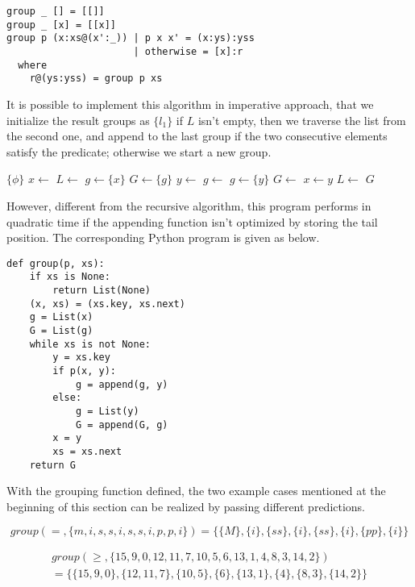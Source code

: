 \documentclass[b5paper]{article}
\begin{document}
\lstset{language=Haskell}
\begin{lstlisting}
group _ [] = [[]]
group _ [x] = [[x]]
group p (x:xs@(x':_)) | p x x' = (x:ys):yss
                      | otherwise = [x]:r
  where
    r@(ys:yss) = group p xs
\end{lstlisting}

It is possible to implement this algorithm in imperative approach, that we initialize the result groups as
$\{{l_1\}}$ if $L$ isn't empty, then we traverse the list from the second one, and append to the last group
if the two consecutive elements satisfy the predicate; otherwise we start a new group.

\begin{algorithmic}[1]
    \State \Return $\{ \phi \}$
  \EndIf
  \State $x \gets$ 
  \State $L \gets$ 
  \State $g \gets \{ x \}$
  \State $G \gets \{ g \}$
    \State $y \gets$ 
      \State $g \gets $ 
    \Else
      \State $g \gets \{y\}$
      \State $G \gets$ 
    \EndIf
    \State $x \gets y$
    \State $L \gets$ 
  \EndWhile
  \State \Return $G$
\EndFunction
\end{algorithmic}

However, different from the recursive algorithm, this program performs in quadratic time if the appending
function isn't optimized by storing the tail position.
The corresponding Python program is given as below.

\lstset{language=Python}
\begin{lstlisting}
def group(p, xs):
    if xs is None:
        return List(None)
    (x, xs) = (xs.key, xs.next)
    g = List(x)
    G = List(g)
    while xs is not None:
        y = xs.key
        if p(x, y):
            g = append(g, y)
        else:
            g = List(y)
            G = append(G, g)
        x = y
        xs = xs.next
    return G
\end{lstlisting}

With the grouping function defined, the two example cases mentioned at the beginning of this section can be
realized by passing different predictions.

\[
group(=, \{m,i,s,s,i,s,s,i,p,p,i\}) = \{ \{M\}, \{i\}, \{ss\}, \{i\}, \{ss\}, \{i\}, \{pp\}, \{i\} \}
\]

\[
\begin{array}{l}
group(\geq,  \{15, 9, 0, 12, 11, 7, 10, 5, 6, 13, 1, 4, 8, 3, 14, 2\}) \\
  = \{ \{15, 9, 0\}, \{12, 11, 7\}, \{10, 5\}, \{6\}, \{13, 1\}, \{4\}, \{8, 3\}, \{14, 2\}\}
\end{array}
\]
\end{document}

